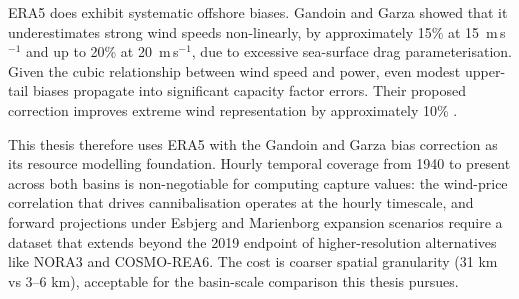 \begin{table}[ht]
\centering
\small
\caption{Comparison of reanalysis and wind resource datasets for European offshore wind assessment. ERA5 is the only product spanning both basins with hourly resolution from 1940 to present, making it the default choice for cross-basin capture value analysis despite its coarser spatial grid.}
\label{tab:reanalysis_comparison}
\end{table}

ERA5 does exhibit systematic offshore biases. Gandoin and Garza \cite{Gandoin2024} showed that it underestimates strong wind speeds non-linearly, by approximately 15\% at 15~m\,s$^{-1}$ and up to 20\% at 20~m\,s$^{-1}$, due to excessive sea-surface drag parameterisation. Given the cubic relationship between wind speed and power, even modest upper-tail biases propagate into significant capacity factor errors. Their proposed correction improves extreme wind representation by approximately 10\% \cite{Gandoin2024}.

This thesis therefore uses ERA5 with the Gandoin and Garza bias correction as its resource modelling foundation. Hourly temporal coverage from 1940 to present across both basins is non-negotiable for computing capture values: the wind-price correlation that drives cannibalisation operates at the hourly timescale, and forward projections under Esbjerg and Marienborg expansion scenarios require a dataset that extends beyond the 2019 endpoint of higher-resolution alternatives like NORA3 and COSMO-REA6. The cost is coarser spatial granularity (31 km vs 3--6 km), acceptable for the basin-scale comparison this thesis pursues.

